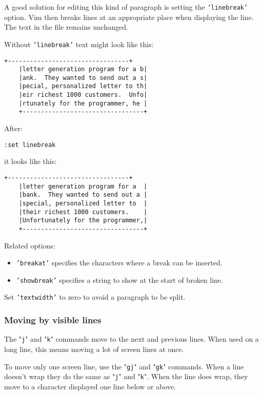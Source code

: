 A good solution for editing this kind of paragraph is setting the \texttt{'linebreak'} option.
Vim then breaks lines at an appropriate place when displaying the line.
The text in the file remains unchanged.

Without \texttt{'linebreak'} text might look like this:

\begin{Verbatim}[samepage=true]
    +---------------------------------+
    |letter generation program for a b|
    |ank.  They wanted to send out a s|
    |pecial, personalized letter to th|
    |eir richest 1000 customers.  Unfo|
    |rtunately for the programmer, he |
    +---------------------------------+
\end{Verbatim}

After:

\begin{Verbatim}[samepage=true]
 :set linebreak
\end{Verbatim}

it looks like this:

\begin{Verbatim}[samepage=true]
    +---------------------------------+
    |letter generation program for a  |
    |bank.  They wanted to send out a |
    |special, personalized letter to  |
    |their richest 1000 customers.    |
    |Unfortunately for the programmer,|
    +---------------------------------+
\end{Verbatim}

Related options:
\begin{itemize}
				\item \texttt{'breakat'} specifies the characters where a break can be inserted.
				\item \texttt{'showbreak'} specifies a string to show at the start of broken line.
\end{itemize}
Set \texttt{'textwidth'} to zero to avoid a paragraph to be split.
\subsubsection{Moving by visible lines}
The "\texttt{j}" and "\texttt{k}" commands move to the next and previous lines.
When used on a long line, this means moving a lot of screen lines at once.

To move only one screen line, use the "\texttt{gj}" and "\texttt{gk}" commands.
When a line doesn't wrap they do the same as "\texttt{j}" and "\texttt{k}".
When the line does wrap, they move to a character displayed one line below or above.

